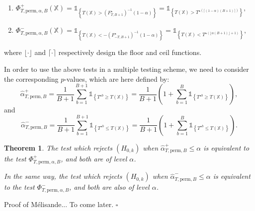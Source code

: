 \documentclass[a4paper,oneside,10pt]{article}
\newtheorem{thm}{Theorem}[subsection]
\newenvironment{dem}{\noindent{\bf Proof :}}{\hfill             %
  $\square$\par \noindent}
\newcommand{\pa}[1]{\ensuremath{\left( #1 \right)}}
\newcommand{\X}{\ensuremath{\mathds{X}}}
\newcommand{\1}[1]{\ensuremath{\mathds{1}_{\left\{ #1 \right\}}}}  %
\begin{document}
\begin{enumerate}
\item $\Phi_{T,\textrm{perm},\alpha,B}^{+}(\X)=\1{T(\X)>\pa{F^\star_{T,B+1}}^{-1}(1-\alpha)}
=\1{T(\X)>T^{\star (\lceil (1-\alpha)(B+1) \rceil)}},$
\item $\Phi_{T,\textrm{perm},\alpha,B}^{-}(\X)=\1{T(\X)<-\pa{F^\star_{-T,B+1}}^{-1}(1-\alpha)}
=\1{T(\X)<T^{\star (\lfloor \alpha (B+1) \rfloor + 1 )}},$
\end{enumerate}
where $\lfloor\cdot\rfloor$ and $\lceil\cdot\rceil$ respectively design the floor and ceil functions.

In order to use the above tests in a multiple testing scheme, we need to consider the corresponding $p$-values, which are here defined by:
$$\hat{\alpha}^+_{T,\textrm{perm},B}=\frac{1}{B+1}\sum_{b=1}^{B+1} \1{T^{\star b} \geq T(\X)}=\frac{1}{B+1}\pa{1+\sum_{b=1}^B \1{T^{\star b}\geq T(\X)}},$$
and 
$$\hat{\alpha}^-_{T,\textrm{perm},B}=\frac{1}{B+1}\sum_{b=1}^{B+1} \1{T^{\star b}\leq T(\X)}=\frac{1}{B+1}\pa{1+\sum_{b=1}^B \1{T^{\star b}\leq T(\X)}}.$$

\begin{thm}
The test which rejects $(H_{0,k})$ when $\hat{\alpha}^+_{T,\textrm{perm},B}\leq \alpha$ is equivalent to the test $\Phi_{T,\textrm{perm},\alpha,B}^+$, and both are of level $\alpha$.

In the same way, the test which rejects $(H_{0,k})$ when $\hat{\alpha}^-_{T,\textrm{perm},B}\leq \alpha$ is equivalent to the test $ \Phi_{T,\textrm{perm},\alpha,B}^-$, and both are also of level $\alpha$.
\end{thm}

\begin{dem}
Proof of Mélisande... To come later.
\end{dem}
\end{document}

